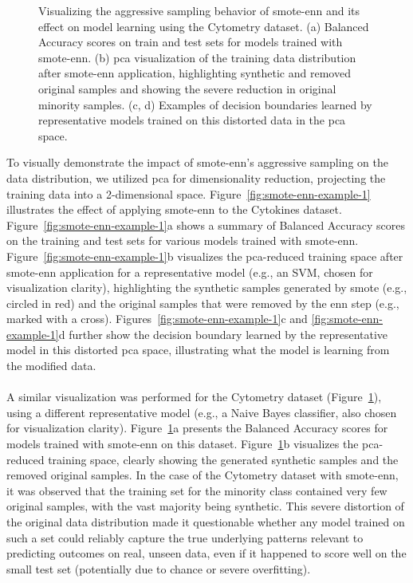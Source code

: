 \documentclass[12pt,a4paper]{report}
\begin{document}
\begin{figure}[h!]
    \caption[Visualizing \gls{smote}-\gls{enn} on Cytometry]{Visualizing the aggressive sampling behavior of \gls{smote}-\gls{enn} and its effect on model learning using the Cytometry dataset. (a) Balanced Accuracy scores on train and test sets for models trained with \gls{smote}-\gls{enn}. (b) \gls{pca} visualization of the training data distribution after \gls{smote}-\gls{enn} application, highlighting synthetic and removed original samples and showing the severe reduction in original minority samples. (c, d) Examples of decision boundaries learned by representative models trained on this distorted data in the \gls{pca} space.}

    \label{fig:smote-enn-example-2}
\end{figure}

\noindent
To visually demonstrate the impact of \gls{smote}-\gls{enn}'s aggressive sampling on the data distribution, we utilized \acrfull{pca} for dimensionality reduction, projecting the training data into a 2-dimensional space. Figure~\ref{fig:smote-enn-example-1} illustrates the effect of applying \gls{smote}-\gls{enn} to the Cytokines dataset. Figure~\ref{fig:smote-enn-example-1}a shows a summary of Balanced Accuracy scores on the training and test sets for various models trained with \gls{smote}-\gls{enn}. Figure~\ref{fig:smote-enn-example-1}b visualizes the \gls{pca}-reduced training space after \gls{smote}-\gls{enn} application for a representative model (e.g., an SVM, chosen for visualization clarity), highlighting the synthetic samples generated by \gls{smote} (e.g., circled in red) and the original samples that were removed by the \gls{enn} step (e.g., marked with a cross). Figures~\ref{fig:smote-enn-example-1}c and \ref{fig:smote-enn-example-1}d further show the decision boundary learned by the representative model in this distorted \gls{pca} space, illustrating what the model is learning from the modified data.\\
\\
A similar visualization was performed for the Cytometry dataset (Figure~\ref{fig:smote-enn-example-2}), using a different representative model (e.g., a Naive Bayes classifier, also chosen for visualization clarity). Figure~\ref{fig:smote-enn-example-2}a presents the Balanced Accuracy scores for models trained with \gls{smote}-\gls{enn} on this dataset. Figure~\ref{fig:smote-enn-example-2}b visualizes the \gls{pca}-reduced training space, clearly showing the generated synthetic samples and the removed original samples. In the case of the Cytometry dataset with \gls{smote}-\gls{enn}, it was observed that the training set for the minority class contained very few original samples, with the vast majority being synthetic. This severe distortion of the original data distribution made it questionable whether any model trained on such a set could reliably capture the true underlying patterns relevant to predicting outcomes on real, unseen data, even if it happened to score well on the small test set (potentially due to chance or severe overfitting).\\
\end{document}
